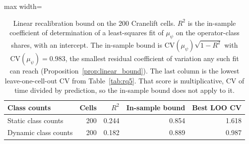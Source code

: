 \begin{table}[t]
\caption{Linear recalibration bound on the 200 Cranelift cells. $R^2$ is the in-sample coefficient of determination of a least-squares fit of $\mu_\psi$ on the operator-class shares, with an intercept. The in-sample bound is $\mathrm{CV}(\mu_\psi)\sqrt{1-R^2}$ with $\mathrm{CV}(\mu_\psi)=0.983$, the smallest residual coefficient of variation any such fit can reach (Proposition~\ref{prop:linear_bound}). The last column is the lowest leave-one-cell-out CV from Table~\ref{tab:rq5}. That score is multiplicative, CV of time divided by prediction, so the in-sample bound does not apply to it.}\label{tab:rq5_bound}
\begin{adjustbox}{max width=\textwidth}%
\begin{tabular}{lrrrr}
\toprule
Class counts & Cells & $R^2$ & In-sample bound & Best LOO CV \\
\midrule
Static class counts & 200 & 0.244 & 0.854 & 1.618 \\
Dynamic class counts & 200 & 0.182 & 0.889 & 0.987 \\
\bottomrule
\end{tabular}%
\end{adjustbox}
\end{table}
